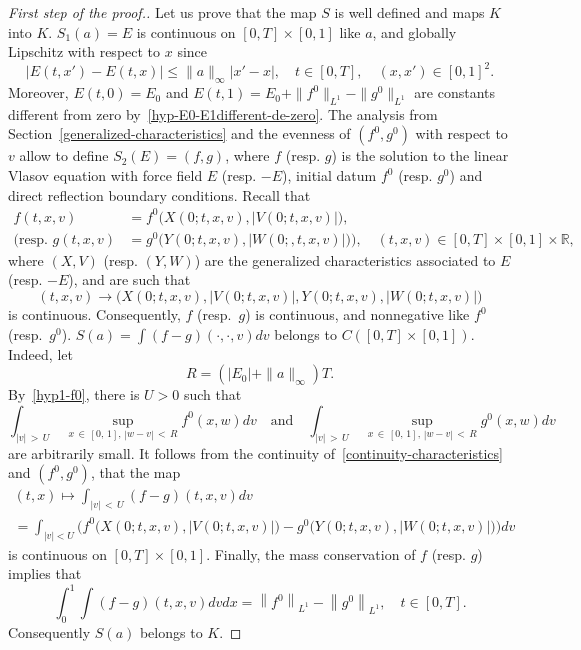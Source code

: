 \documentclass[AHL,Unicode,longabstracts,published]{cedram}
\newcommand{\R}{\mathbb{R}}
\begin{document}
\begin{proof}[{First step of the proof.}]
Let us prove that the map $S$ is well defined and maps $K$ into $K$. $S_1(a) = E$ is continuous on $[0,T] \times [0,1]$ like $a$, and globally Lipschitz with respect to $x$ since
\begin{equation}
\left| E\left(t,x'\right) - E(t,x) \right| \leq \| a \|_\infty |x' - x|, \quad t \in [0,T],\quad (x,x') \in [0,1]^2.\label{E_lip}
\end{equation}
Moreover, $E(t,0)= E_0$ and $E(t,1)= E_0+ \| f^0 \|_{L^1} - \| g^0 \|_{L^1}$ are constants different from zero by~\eqref{hyp-E0-E1different-de-zero}. The analysis from Section~\ref{generalized-characteristics} and the evenness of $(f^0,g^0) $ with respect to $v$ allow to define $S_2(E)= (f,g)$, where $f$ (resp. $g$) is the solution to the linear Vlasov equation with force field $E$ (resp. $-E$), initial datum $f^0$ (resp. $g^0$) and direct reflection boundary conditions. Recall that
\begin{align*}
f(t,x,v)&= f^0\big(X(0;t,x,v),|V(0;t,x,v)|\big),\\
\big(\text{resp. } g(t,x,v)&= g^0\big(Y(0;t,x,v),|W(0;,t,x,v)|\big)\big),\quad (t,x,v)\in [0,T] \times [0,1] \times \R,
\end{align*}
where $(X,V)$ (resp. $(Y,W)$) are the generalized characteristics associated to $E$ (resp. $-E$), and are such that
\begin{equation}\label{continuity-characteristics}
(t,x,v)\rightarrow \big(X(0;t,x,v),\lvert V(0;t,x,v)\rvert,Y(0;t,x,v),\lvert W(0;t,x,v)\rvert\big)
\end{equation}
is continuous. Consequently, $f$ (resp.~$g$) is continuous, and nonnegative like $f^0$ (resp.~$g^0$). 
$S(a)=\int (f-g)(\cdot,\cdot,v)dv$ belongs to $C([0,T] \times [0,1])$. Indeed, let
\[
R= \left(\left|E_0\right| + \|a \|_\infty \right) T.
\]
By~\eqref{hyp1-f0}, there is $U>0$ such that
\[
\int_{|v|\,>\,U}\;\sup_{x\,\in\,[0,\,1],\,|w-v|\,<\,R} f^0(x,w)dv \quad \text{and} \quad \int_{|v|\,>\,U}\; \sup_{x\,\in\,[0,\,1],\,|w-v|\,<\,R} g^0(x,w)dv
\]
are arbitrarily small. It follows from the continuity of~\eqref{continuity-characteristics} and $(f^0,g^0)$, that the map
\begin{multline*}
(t,x) \mapsto \int _{|v|\,<\,U}(f-g)(t,x,v)dv\\
= \int_{|v|<U} \Big(f^0\big(X(0;t,x,v),\lvert V(0;t,x,v)\rvert\big)-g^0\big(Y(0;t,x,v),\lvert W(0;t,x,v)\rvert\big) \Big) dv
\end{multline*}
is continuous on $[0,T] \times [0,1]$. Finally, the mass conservation of $f$ (resp. $g$) implies that
\[
\int_0^1 \int (f-g)(t,x,v)dvdx= \left\|f^0\right\|_{L^1} - \left\|g^0\right\|_{L^1}, \quad t \in [0,T].
\]
Consequently $S(a)$ belongs to $K$.
\end{proof}
\end{document}
